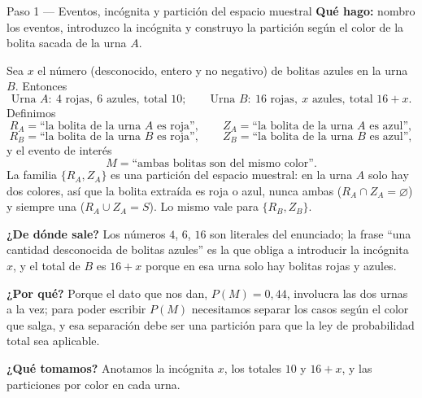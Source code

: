 \documentclass[11pt]{article}
\begin{document}
\begin{paso}{Paso 1 --- Eventos, incógnita y partición del espacio muestral}
\textbf{Qué hago:} nombro los eventos, introduzco la incógnita y construyo la partición según el color de la bolita sacada de la urna $A$.

Sea $x$ el número (desconocido, entero y no negativo) de bolitas azules en la urna $B$. Entonces
\[
\text{Urna } A:\ 4 \text{ rojas},\ 6 \text{ azules},\ \text{total } 10;
\qquad
\text{Urna } B:\ 16 \text{ rojas},\ x \text{ azules},\ \text{total } 16+x .
\]
Definimos
\[
R_A=\text{``la bolita de la urna $A$ es roja''},\qquad Z_A=\text{``la bolita de la urna $A$ es azul''},
\]
\[
R_B=\text{``la bolita de la urna $B$ es roja''},\qquad Z_B=\text{``la bolita de la urna $B$ es azul''},
\]
y el evento de interés
\[
M=\text{``ambas bolitas son del mismo color''}.
\]
La familia $\{R_A,Z_A\}$ es una partición del espacio muestral: en la urna $A$ solo hay dos colores, así que la bolita extraída es roja o azul, nunca ambas ($R_A\cap Z_A=\varnothing$) y siempre una ($R_A\cup Z_A=S$). Lo mismo vale para $\{R_B,Z_B\}$.

\textbf{¿De dónde sale?} Los números $4$, $6$, $16$ son literales del enunciado; la frase ``una cantidad desconocida de bolitas azules'' es la que obliga a introducir la incógnita $x$, y el total de $B$ es $16+x$ porque en esa urna solo hay bolitas rojas y azules.

\textbf{¿Por qué?} Porque el dato que nos dan, $P(M)=0{,}44$, involucra las dos urnas a la vez; para poder escribir $P(M)$ necesitamos separar los casos según el color que salga, y esa separación debe ser una partición para que la ley de probabilidad total sea aplicable.

\textbf{¿Qué tomamos?} Anotamos la incógnita $x$, los totales $10$ y $16+x$, y las particiones por color en cada urna.
\end{paso}
\end{document}
